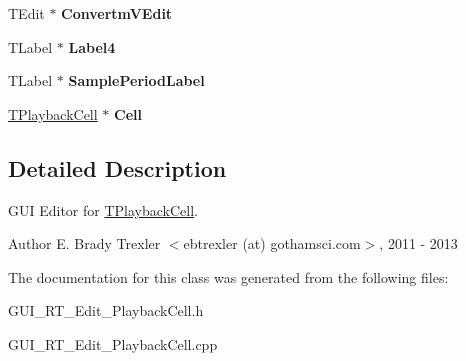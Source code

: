 \begin{DoxyCompactItemize}
\item 
\hypertarget{class_t_playback_cell_form_a051e3e5ba88389b241acecdc60789e2a}{T\+Edit $\ast$ {\bfseries Convertm\+V\+Edit}}\label{class_t_playback_cell_form_a051e3e5ba88389b241acecdc60789e2a}

\item 
\hypertarget{class_t_playback_cell_form_a745aa9fef4f3503c9ebc547143d3aa10}{T\+Label $\ast$ {\bfseries Label4}}\label{class_t_playback_cell_form_a745aa9fef4f3503c9ebc547143d3aa10}

\item 
\hypertarget{class_t_playback_cell_form_a73982a03117ea8a92d435c7af9790ce4}{T\+Label $\ast$ {\bfseries Sample\+Period\+Label}}\label{class_t_playback_cell_form_a73982a03117ea8a92d435c7af9790ce4}

\item 
\hypertarget{class_t_playback_cell_form_abee824f4ec7e041b3425e9d46e5cca7d}{\hyperlink{class_t_playback_cell}{T\+Playback\+Cell} $\ast$ {\bfseries Cell}}\label{class_t_playback_cell_form_abee824f4ec7e041b3425e9d46e5cca7d}

\end{DoxyCompactItemize}


\subsection{Detailed Description}
G\+U\+I Editor for \hyperlink{class_t_playback_cell}{T\+Playback\+Cell}. 

\begin{DoxyAuthor}{Author}
E. Brady Trexler $<$ebtrexler (at) gothamsci.\+com$>$, 2011 -\/ 2013 
\end{DoxyAuthor}


The documentation for this class was generated from the following files\+:\begin{DoxyCompactItemize}
\item 
G\+U\+I\+\_\+\+R\+T\+\_\+\+Edit\+\_\+\+Playback\+Cell.\+h\item 
G\+U\+I\+\_\+\+R\+T\+\_\+\+Edit\+\_\+\+Playback\+Cell.\+cpp\end{DoxyCompactItemize}
